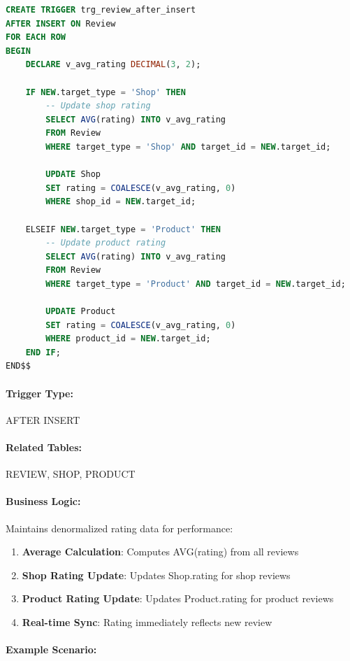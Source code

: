 \begin{lstlisting}[language=SQL, caption=Trigger: trg\_review\_after\_insert, label=lst:trg_review_after]
CREATE TRIGGER trg_review_after_insert
AFTER INSERT ON Review
FOR EACH ROW
BEGIN
    DECLARE v_avg_rating DECIMAL(3, 2);
    
    IF NEW.target_type = 'Shop' THEN
        -- Update shop rating
        SELECT AVG(rating) INTO v_avg_rating
        FROM Review
        WHERE target_type = 'Shop' AND target_id = NEW.target_id;
        
        UPDATE Shop
        SET rating = COALESCE(v_avg_rating, 0)
        WHERE shop_id = NEW.target_id;
    
    ELSEIF NEW.target_type = 'Product' THEN
        -- Update product rating
        SELECT AVG(rating) INTO v_avg_rating
        FROM Review
        WHERE target_type = 'Product' AND target_id = NEW.target_id;
        
        UPDATE Product
        SET rating = COALESCE(v_avg_rating, 0)
        WHERE product_id = NEW.target_id;
    END IF;
END$$
\end{lstlisting}

\paragraph{Trigger Type:} AFTER INSERT

\paragraph{Related Tables:} REVIEW, SHOP, PRODUCT

\paragraph{Business Logic:}
Maintains denormalized rating data for performance:
\begin{enumerate}
    \item \textbf{Average Calculation}: Computes AVG(rating) from all reviews
    \item \textbf{Shop Rating Update}: Updates Shop.rating for shop reviews
    \item \textbf{Product Rating Update}: Updates Product.rating for product reviews
    \item \textbf{Real-time Sync}: Rating immediately reflects new review
\end{enumerate}

\paragraph{Example Scenario:}

